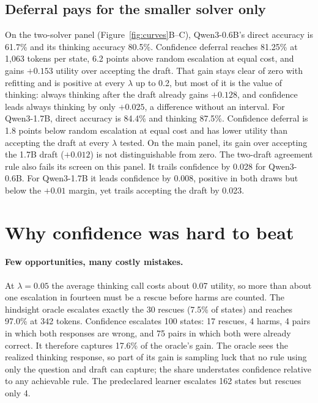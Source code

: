 \documentclass[10pt,letterpaper]{article}
\newcommand{\lam}{\lambda}
\begin{document}
\subsection{Deferral pays for the smaller solver only}

On the two-solver panel (Figure~\ref{fig:curves}B--C), Qwen3-0.6B's direct accuracy is 61.7\% and its thinking accuracy 80.5\%. Confidence deferral reaches 81.25\% at 1,063 tokens per state, 6.2 points above random escalation at equal cost, and gains $+0.153$ utility over accepting the draft. That gain stays clear of zero with refitting and is positive at every $\lam$ up to 0.2, but most of it is the value of thinking: always thinking after the draft already gains $+0.128$, and confidence leads always thinking by only $+0.025$, a difference without an interval. For Qwen3-1.7B, direct accuracy is 84.4\% and thinking 87.5\%. Confidence deferral is 1.8 points below random escalation at equal cost and has lower utility than accepting the draft at every $\lam$ tested. On the main panel, its gain over accepting the 1.7B draft ($+0.012$) is not distinguishable from zero. The two-draft agreement rule also fails its screen on this panel. It trails confidence by 0.028 for Qwen3-0.6B. For Qwen3-1.7B it leads confidence by 0.008, positive in both draws but below the $+0.01$ margin, yet trails accepting the draft by 0.023.

\section{Why confidence was hard to beat}

\paragraph{Few opportunities, many costly mistakes.} At $\lam=0.05$ the average thinking call costs about 0.07 utility, so more than about one escalation in fourteen must be a rescue before harms are counted. The hindsight oracle escalates exactly the 30 rescues (7.5\% of states) and reaches 97.0\% at 342 tokens. Confidence escalates 100 states: 17 rescues, 4 harms, 4 pairs in which both responses are wrong, and 75 pairs in which both were already correct. It therefore captures 17.6\% of the oracle's gain. The oracle sees the realized thinking response, so part of its gain is sampling luck that no rule using only the question and draft can capture; the share understates confidence relative to any achievable rule. The predeclared learner escalates 162 states but rescues only 4.
\end{document}
